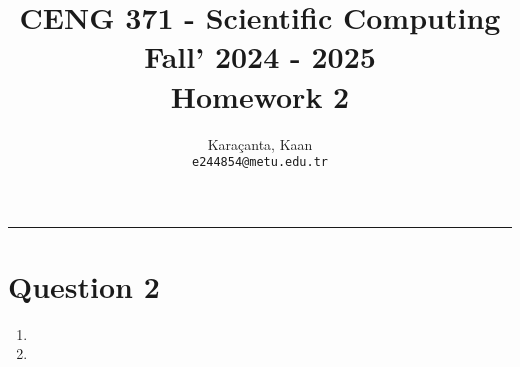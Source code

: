 \documentclass[11pt,a4paper, margin=1in]{article}
\author{
  Karaçanta, Kaan\\
  \texttt{e244854@metu.edu.tr}
}
\title{CENG 371 - Scientific Computing \\
Fall' 2024 - 2025 \\
Homework 2}
\date{}
\begin{document}
\maketitle

\noindent\rule{19cm}{1.2pt}

\section*{Question 2}

\begin{enumerate}

    \item 
    
    \item 

\end{enumerate}
\end{document}
